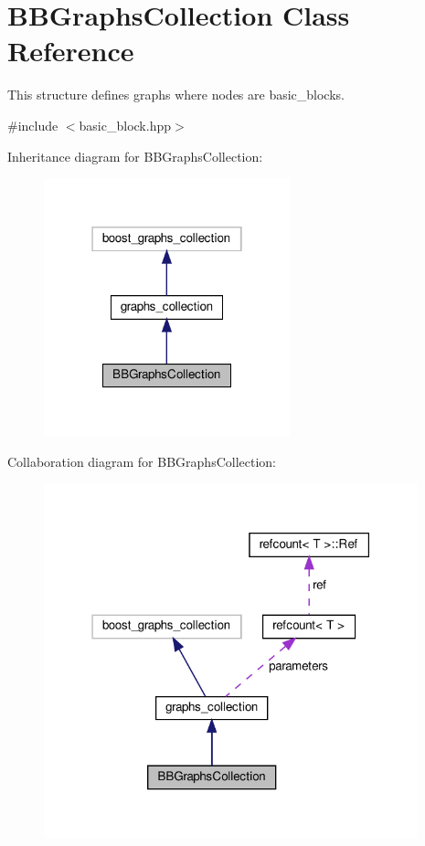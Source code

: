 \hypertarget{classBBGraphsCollection}{}\section{B\+B\+Graphs\+Collection Class Reference}
\label{classBBGraphsCollection}


This structure defines graphs where nodes are basic\+\_\+blocks.  




{\ttfamily \#include $<$basic\+\_\+block.\+hpp$>$}



Inheritance diagram for B\+B\+Graphs\+Collection\+:
\nopagebreak
\begin{figure}[H]
\begin{center}
\leavevmode
\includegraphics[width=202pt]{da/d33/classBBGraphsCollection__inherit__graph}
\end{center}
\end{figure}


Collaboration diagram for B\+B\+Graphs\+Collection\+:
\nopagebreak
\begin{figure}[H]
\begin{center}
\leavevmode
\includegraphics[width=307pt]{da/d6a/classBBGraphsCollection__coll__graph}
\end{center}
\end{figure}
